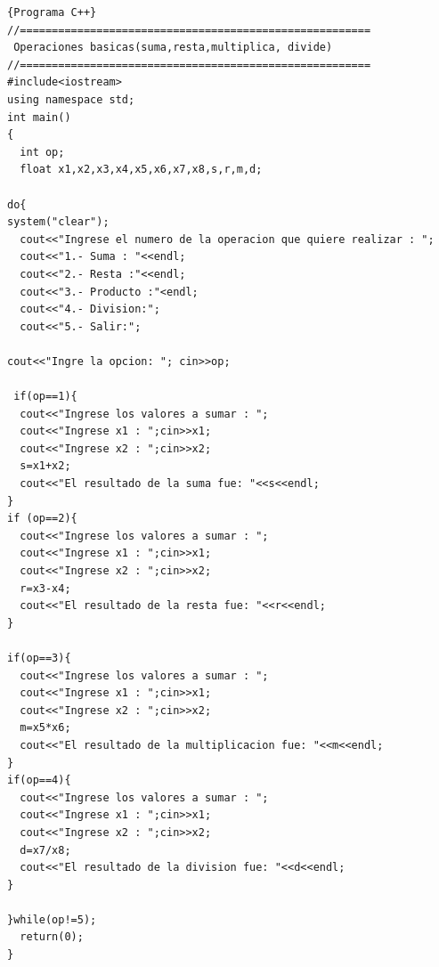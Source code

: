 \documentclass[a4paper,12pt,spanish]{article}
\newcommand\mylstcaption{}
\begin{document}
\renewcommand\mylstcaption{\textbf{operbasi4.cpp}: Operaciones Básicas}
    
\begin{lstlisting}[frame=trBL,firstnumber=1,caption=\mylstcaption]{Programa C++}
//=======================================================
 Operaciones basicas(suma,resta,multiplica, divide)
//=======================================================
#include<iostream>
using namespace std;
int main()
{
  int op;
  float x1,x2,x3,x4,x5,x6,x7,x8,s,r,m,d;

do{
system("clear");  
  cout<<"Ingrese el numero de la operacion que quiere realizar : ";
  cout<<"1.- Suma : "<<endl;
  cout<<"2.- Resta :"<<endl;
  cout<<"3.- Producto :"<endl;
  cout<<"4.- Division:";
  cout<<"5.- Salir:";

cout<<"Ingre la opcion: "; cin>>op;

 if(op==1){
  cout<<"Ingrese los valores a sumar : ";
  cout<<"Ingrese x1 : ";cin>>x1;
  cout<<"Ingrese x2 : ";cin>>x2;
  s=x1+x2;
  cout<<"El resultado de la suma fue: "<<s<<endl;
}
if (op==2){
  cout<<"Ingrese los valores a sumar : ";
  cout<<"Ingrese x1 : ";cin>>x1;
  cout<<"Ingrese x2 : ";cin>>x2;
  r=x3-x4;
  cout<<"El resultado de la resta fue: "<<r<<endl;
}

if(op==3){
  cout<<"Ingrese los valores a sumar : ";
  cout<<"Ingrese x1 : ";cin>>x1;
  cout<<"Ingrese x2 : ";cin>>x2;
  m=x5*x6;
  cout<<"El resultado de la multiplicacion fue: "<<m<<endl;
}
if(op==4){
  cout<<"Ingrese los valores a sumar : ";
  cout<<"Ingrese x1 : ";cin>>x1;
  cout<<"Ingrese x2 : ";cin>>x2;
  d=x7/x8;
  cout<<"El resultado de la division fue: "<<d<<endl;
}

}while(op!=5);
  return(0);
}
  
\end{lstlisting}
\end{document}
